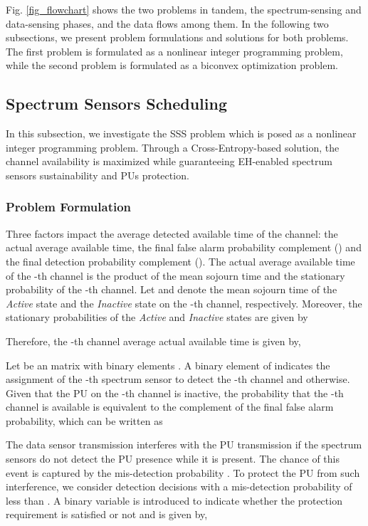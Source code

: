 \documentclass[journal]{IEEEtran} \ifCLASSINFOpdf
\begin{document}
Fig. \ref{fig_flowchart} shows the two problems in tandem, the spectrum-sensing and data-sensing phases, and the data flows among them. In the following two subsections, we present problem formulations and solutions for both problems. The first problem is formulated as a nonlinear integer programming problem, while the second problem is formulated as a biconvex optimization problem.

\subsection{Spectrum Sensors Scheduling} \label{sec:spectrum_sensing}
In this subsection, we investigate the SSS problem which is posed as a nonlinear integer programming problem. Through a Cross-Entropy-based solution, the channel availability is maximized while guaranteeing EH-enabled spectrum sensors sustainability and PUs protection.
\subsubsection{Problem Formulation}
Three factors impact the average detected available time of the channel: the actual average available time, the final false alarm probability complement () and the final detection probability complement (). The actual average available time of the -th channel is the product of the mean sojourn time and the stationary probability of the -th channel. Let  and  denote the mean sojourn time of the \textit{Active} state and the \textit{Inactive} state on the -th channel, respectively. Moreover, the stationary probabilities of the \textit{Active} and \textit{Inactive} states are given by

Therefore, the -th channel average actual available time is given by,

Let  be an  matrix with binary elements . A binary element of  indicates the assignment of the -th spectrum sensor to detect the -th channel and  otherwise. Given that the PU on the -th channel is inactive, the probability that the -th channel is available is equivalent to the complement of the final false alarm probability, which can be written as

The data sensor transmission interferes with the PU transmission if the spectrum sensors do not detect the PU presence while it is present. The chance of this event is captured by the mis-detection probability . To protect the PU from such interference, we consider detection decisions with a mis-detection probability of less than . A binary variable  is introduced to indicate whether the protection requirement is satisfied or not and is given by,
\end{document}
